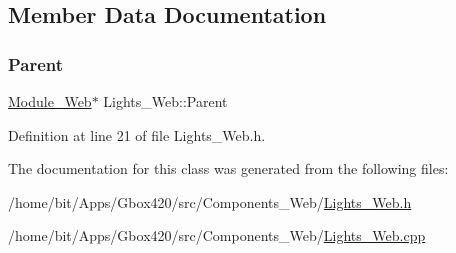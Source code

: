 \subsection{Member Data Documentation}
\mbox{\label{class_lights___web_a83a1b2c2358a647f81c29e5e2ce5f6a7}} 
\subsubsection{\texorpdfstring{Parent}{Parent}}
{\footnotesize\ttfamily \hyperlink{class_module___web}{Module\+\_\+\+Web}$\ast$ Lights\+\_\+\+Web\+::\+Parent\hspace{0.3cm}{\ttfamily [protected]}}



Definition at line 21 of file Lights\+\_\+\+Web.\+h.



The documentation for this class was generated from the following files\+:\begin{DoxyCompactItemize}
\item 
/home/bit/\+Apps/\+Gbox420/src/\+Components\+\_\+\+Web/\hyperlink{_lights___web_8h}{Lights\+\_\+\+Web.\+h}\item 
/home/bit/\+Apps/\+Gbox420/src/\+Components\+\_\+\+Web/\hyperlink{_lights___web_8cpp}{Lights\+\_\+\+Web.\+cpp}\end{DoxyCompactItemize}
